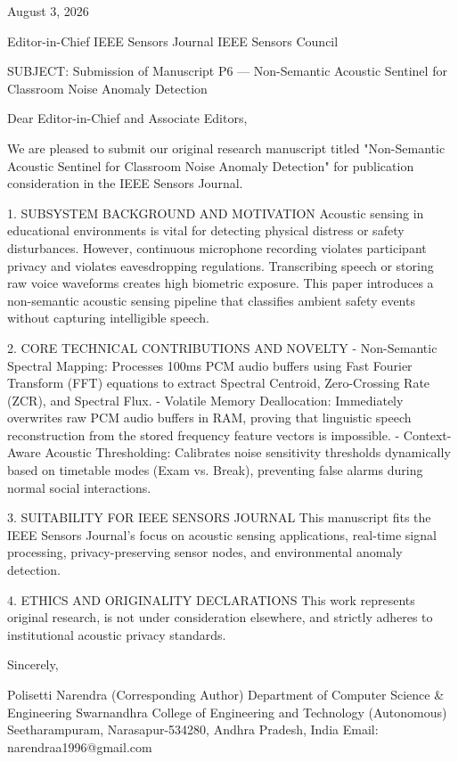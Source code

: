 August 3, 2026

Editor-in-Chief
IEEE Sensors Journal
IEEE Sensors Council

SUBJECT: Submission of Manuscript P6 — Non-Semantic Acoustic Sentinel for Classroom Noise Anomaly Detection

Dear Editor-in-Chief and Associate Editors,

We are pleased to submit our original research manuscript titled "Non-Semantic Acoustic Sentinel for Classroom Noise Anomaly Detection" for publication consideration in the IEEE Sensors Journal.

1. SUBSYSTEM BACKGROUND AND MOTIVATION
Acoustic sensing in educational environments is vital for detecting physical distress or safety disturbances. However, continuous microphone recording violates participant privacy and violates eavesdropping regulations. Transcribing speech or storing raw voice waveforms creates high biometric exposure. This paper introduces a non-semantic acoustic sensing pipeline that classifies ambient safety events without capturing intelligible speech.

2. CORE TECHNICAL CONTRIBUTIONS AND NOVELTY
  - Non-Semantic Spectral Mapping: Processes 100ms PCM audio buffers using Fast Fourier Transform (FFT) equations to extract Spectral Centroid, Zero-Crossing Rate (ZCR), and Spectral Flux.
  - Volatile Memory Deallocation: Immediately overwrites raw PCM audio buffers in RAM, proving that linguistic speech reconstruction from the stored frequency feature vectors is impossible.
  - Context-Aware Acoustic Thresholding: Calibrates noise sensitivity thresholds dynamically based on timetable modes (Exam vs. Break), preventing false alarms during normal social interactions.

3. SUITABILITY FOR IEEE SENSORS JOURNAL
This manuscript fits the IEEE Sensors Journal's focus on acoustic sensing applications, real-time signal processing, privacy-preserving sensor nodes, and environmental anomaly detection.

4. ETHICS AND ORIGINALITY DECLARATIONS
This work represents original research, is not under consideration elsewhere, and strictly adheres to institutional acoustic privacy standards.

Sincerely,

Polisetti Narendra (Corresponding Author)
Department of Computer Science & Engineering
Swarnandhra College of Engineering and Technology (Autonomous)
Seetharampuram, Narasapur-534280, Andhra Pradesh, India
Email: narendraa1996@gmail.com
